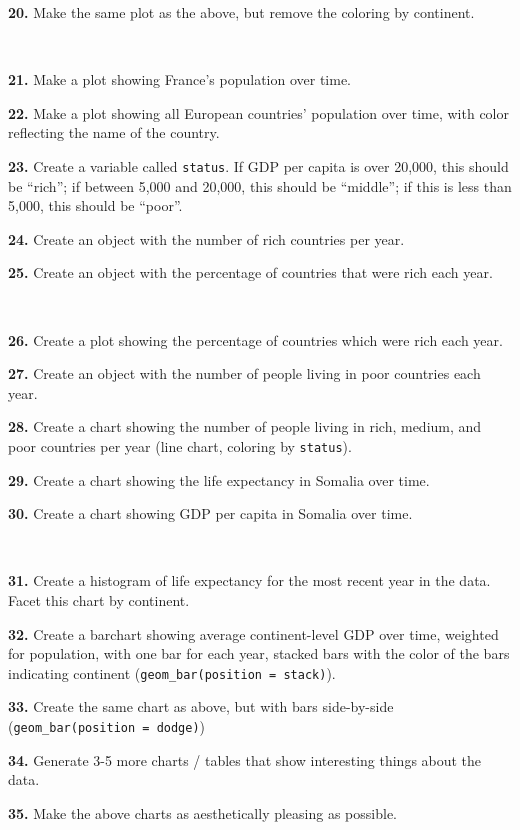 \documentclass[
]{book}
\begin{document}
\textbf{20.} Make the same plot as the above, but remove the coloring by continent.

~

\textbf{21.} Make a plot showing France's population over time.

\textbf{22.} Make a plot showing all European countries' population over time, with color reflecting the name of the country.

\textbf{23.} Create a variable called \texttt{status}. If GDP per capita is over 20,000, this should be ``rich''; if between 5,000 and 20,000, this should be ``middle''; if this is less than 5,000, this should be ``poor''.

\textbf{24.} Create an object with the number of rich countries per year.

\textbf{25.} Create an object with the percentage of countries that were rich each year.

~

\textbf{26.} Create a plot showing the percentage of countries which were rich each year.

\textbf{27.} Create an object with the number of people living in poor countries each year.

\textbf{28.} Create a chart showing the number of people living in rich, medium, and poor countries per year (line chart, coloring by \texttt{status}).

\textbf{29.} Create a chart showing the life expectancy in Somalia over time.

\textbf{30.} Create a chart showing GDP per capita in Somalia over time.

~

\textbf{31.} Create a histogram of life expectancy for the most recent year in the data. Facet this chart by continent.

\textbf{32.} Create a barchart showing average continent-level GDP over time, weighted for population, with one bar for each year, stacked bars with the color of the bars indicating continent (\texttt{geom\_bar(position\ =\ \textquotesingle{}stack\textquotesingle{})}).

\textbf{33.} Create the same chart as above, but with bars side-by-side (\texttt{geom\_bar(position\ =\ \textquotesingle{}dodge\textquotesingle{})})

\textbf{34.} Generate 3-5 more charts / tables that show interesting things about the data.

\textbf{35.} Make the above charts as aesthetically pleasing as possible.

  
\end{document}
